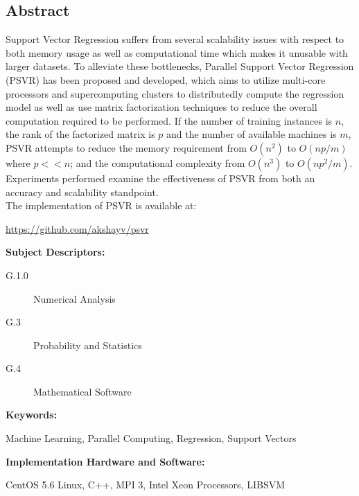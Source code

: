 \documentclass[12pt]{article}
\begin{document}
\begin{center}
\section*{Abstract}
%
\end{center}
\begin{adjustwidth}{2 cm}{2 cm} 
Support Vector Regression suffers from several scalability issues with respect to both memory usage as well as computational time which makes it unusable with larger datasets. To alleviate these bottlenecks, Parallel Support Vector Regression (PSVR) has been proposed and developed, which aims to utilize multi-core processors and supercomputing clusters to distributedly compute the regression model as well as use matrix factorization techniques to reduce the overall computation required to be performed. If the number of training instances is $n$, the rank of the factorized matrix is $p$ and the number of available machines is $m$, PSVR attempts to reduce the memory requirement from $O(n^2)$ to $O(np/m)$ where $p << n$; and the computational complexity from $O(n^3)$ to $O(np^2/m)$. Experiments performed examine the effectiveness of PSVR from both an accuracy and scalability standpoint.\\
The implementation of PSVR is available at:
\begin{center}
 \url{https://github.com/akshayv/psvr}
 \end{center}
\end{adjustwidth}
\vspace{1 cm} 

\begin{adjustwidth}{0 cm}{0 cm}
{\bf Subject Descriptors:} 
\end{adjustwidth}
\begin{adjustwidth}{2 cm}{2 cm}
\begin{description}
\item[G.1.0]	 Numerical Analysis
\item[G.3]    Probability and Statistics
\item[G.4] Mathematical Software
\end{description}
\end{adjustwidth}
{\bf Keywords:} 
\begin{adjustwidth}{2 cm}{2 cm}
Machine Learning, Parallel Computing, Regression, Support Vectors\\
\end{adjustwidth} 
{\bf Implementation Hardware and Software:}
\begin{adjustwidth}{2 cm}{2 cm}
CentOS 5.6 Linux, C++, MPI 3, Intel Xeon Processors, LIBSVM
\end{adjustwidth} 
\newpage
\end{document}
